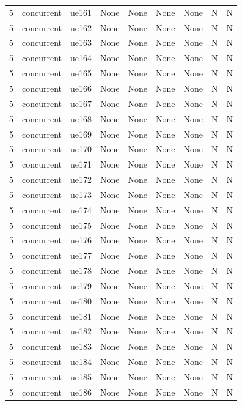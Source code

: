 \begin{table}[ht]
\begin{tabular}{|c|c|c|c|c|c|c|c|c|}
5 & concurrent & ue161 & None & None & None & None & N & N \\
5 & concurrent & ue162 & None & None & None & None & N & N \\
5 & concurrent & ue163 & None & None & None & None & N & N \\
5 & concurrent & ue164 & None & None & None & None & N & N \\
5 & concurrent & ue165 & None & None & None & None & N & N \\
5 & concurrent & ue166 & None & None & None & None & N & N \\
5 & concurrent & ue167 & None & None & None & None & N & N \\
5 & concurrent & ue168 & None & None & None & None & N & N \\
5 & concurrent & ue169 & None & None & None & None & N & N \\
5 & concurrent & ue170 & None & None & None & None & N & N \\
5 & concurrent & ue171 & None & None & None & None & N & N \\
5 & concurrent & ue172 & None & None & None & None & N & N \\
5 & concurrent & ue173 & None & None & None & None & N & N \\
5 & concurrent & ue174 & None & None & None & None & N & N \\
5 & concurrent & ue175 & None & None & None & None & N & N \\
5 & concurrent & ue176 & None & None & None & None & N & N \\
5 & concurrent & ue177 & None & None & None & None & N & N \\
5 & concurrent & ue178 & None & None & None & None & N & N \\
5 & concurrent & ue179 & None & None & None & None & N & N \\
5 & concurrent & ue180 & None & None & None & None & N & N \\
5 & concurrent & ue181 & None & None & None & None & N & N \\
5 & concurrent & ue182 & None & None & None & None & N & N \\
5 & concurrent & ue183 & None & None & None & None & N & N \\
5 & concurrent & ue184 & None & None & None & None & N & N \\
5 & concurrent & ue185 & None & None & None & None & N & N \\
5 & concurrent & ue186 & None & None & None & None & N & N \\

\end{tabular}
\end{table}
